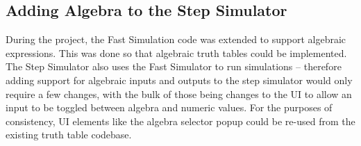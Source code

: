 \subsection{Adding Algebra to the Step Simulator}
During the project, the Fast Simulation code was extended to support algebraic expressions. This was done so that algebraic truth tables could be implemented. The Step Simulator also uses the Fast Simulator to run simulations -- therefore adding support for algebraic inputs and outputs to the step simulator would only require a few changes, with the bulk of those being changes to the UI to allow an input to be toggled between algebra and numeric values. For the purposes of consistency, UI elements like the algebra selector popup could be re-used from the existing truth table codebase.